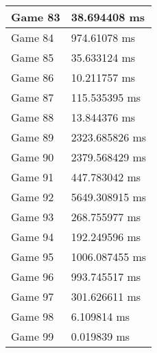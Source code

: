 \begin{tabular}{|l|l|}
	Game 83 & 38.694408 ms \\ \hline
	Game 84 & 974.61078 ms \\ \hline
	Game 85 & 35.633124 ms \\ \hline
	Game 86 & 10.211757 ms \\ \hline
	Game 87 & 115.535395 ms \\ \hline
	Game 88 & 13.844376 ms \\ \hline
	Game 89 & 2323.685826 ms \\ \hline
	Game 90 & 2379.568429 ms \\ \hline
	Game 91 & 447.783042 ms \\ \hline
	Game 92 & 5649.308915 ms \\ \hline
	Game 93 & 268.755977 ms \\ \hline
	Game 94 & 192.249596 ms \\ \hline
	Game 95 & 1006.087455 ms \\ \hline
	Game 96 & 993.745517 ms \\ \hline
	Game 97 & 301.626611 ms \\ \hline
	Game 98 & 6.109814 ms \\ \hline
	Game 99 & 0.019839 ms \\ \hline
\end{tabular}

